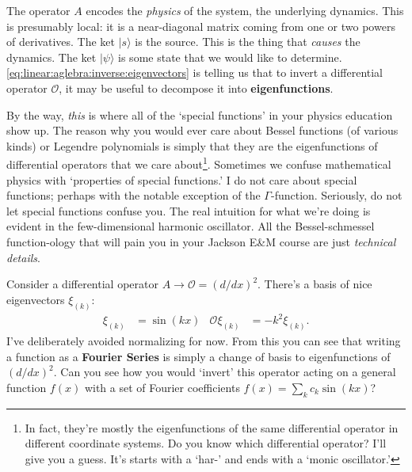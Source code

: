  The operator $A$ encodes the \emph{physics} of the system, the underlying dynamics. This is presumably local: it is a near-diagonal matrix coming from one or two powers of derivatives.  The ket $|s\rangle$ is the source. This is the thing that \emph{causes} the dynamics. The ket $|\psi\rangle$ is some state that we would like to determine. \eqref{eq:linear:aglebra:inverse:eigenvectors} is telling us that to invert a differential operator $\mathcal O$, it may be useful to decompose it into \textbf{eigenfunctions}.

 By the way, \emph{this} is where all of the `special functions' in your physics education show up. The reason why you would ever care about Bessel functions (of various kinds) or Legendre polynomials is simply that they are the eigenfunctions of differential operators that we care about\footnote{In fact, they're mostly the eigenfunctions of the same differential operator in different coordinate systems. Do you know which differential operator? I'll give you a guess. It's starts with a `har-' and ends with a `monic oscillator.'}. Sometimes we confuse mathematical physics with `properties of special functions.' I do not care about special functions; perhaps with the notable exception of the $\Gamma$-function. Seriously, do not let special functions confuse you. The real intuition for what we're doing is evident in the few-dimensional harmonic oscillator. All the Bessel-schmessel function-ology that will pain you in your Jackson E\&M course are just \emph{technical details}.

\begin{example}
Consider a differential operator $A\to \mathcal O = (d/dx)^2$. There's a basis of nice eigenvectors $\xi_{(k)}$:
 \begin{align}
   \xi_{(k)} &= \sin (kx)
   &
   \mathcal O \xi_{(k)} &= -k^2 \xi_{(k)}. 
 \end{align}
 I've deliberately avoided normalizing for now. From this you can see that writing a function as a \textbf{Fourier Series} is simply a change of basis to eigenfunctions of $(d/dx)^2$. Can you see how you would `invert' this operator acting on a general function $f(x)$ with a set of Fourier coefficients $f(x) = \sum_k c_k\sin(kx)$?
\end{example} 


